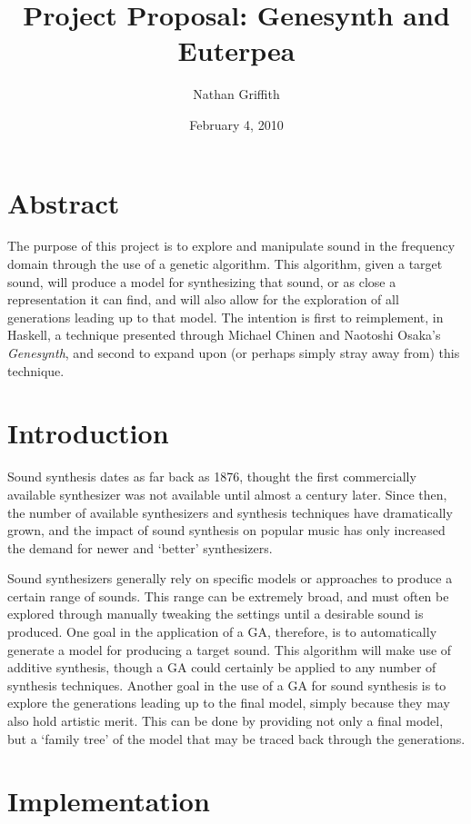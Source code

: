 \documentclass[11pt]{article}
\title{Project Proposal: Genesynth and Euterpea}			%
\author{Nathan  Griffith}		%
\date{February 4, 2010}					%
\begin{document}
\maketitle						%

\section{Abstract}

The purpose of this project is to explore and manipulate sound in the frequency domain through the use of a genetic algorithm. This algorithm, given a target sound, will produce a model for synthesizing that sound, or as close a representation it can find, and will also allow for the exploration of all generations leading up to that model. The intention is first to reimplement, in Haskell, a technique presented through Michael Chinen and Naotoshi Osaka's \emph{Genesynth}\cite{genesynth}, and second to expand upon (or perhaps simply stray away from) this technique.

\section{Introduction}

Sound synthesis dates as far back as 1876, thought the first commercially available synthesizer was not available until almost a century later. Since then, the number of available synthesizers and synthesis techniques have dramatically grown, and the impact of sound synthesis on popular music has only increased the demand for newer and `better' synthesizers.

Sound synthesizers generally rely on specific models or approaches to produce a certain range of sounds. This range can be extremely broad, and must often be explored through manually tweaking the settings until a desirable sound is produced. One goal in the application of a GA, therefore, is to automatically generate a model for producing a target sound. This algorithm will make use of additive synthesis, though a GA could certainly be applied to any number of synthesis techniques. Another goal in the use of a GA for sound synthesis is to explore the generations leading up to the final model, simply because they may also hold artistic merit. This can be done by providing not only a final model, but a `family tree' of the model that may be traced back through the generations.

\section{Implementation}
\end{document}
